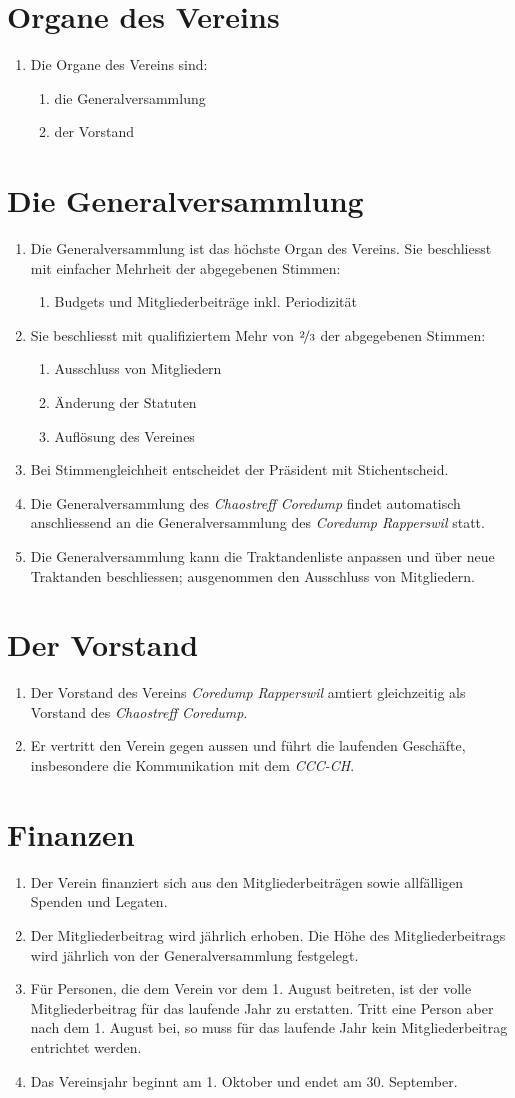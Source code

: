 \documentclass[10pt,a4paper,parskip,fleqn]{scrartcl}
\newcommand{\ol}{\begin{enumerate}[itemsep=-0.2em,topsep=-0.2em]}
\newcommand{\lo}{\end{enumerate}}
\newcommand{\li}{\item}
\newcommand{\name}{Chaostreff Coredump\xspace}
\newcommand{\iname}{\textit{\name}\xspace}
\newcommand{\parent}{Coredump Rapperswil\xspace}
\newcommand{\iparent}{\textit{\parent}\xspace}
\newcommand{\cccch}{CCC-CH\xspace}
\newcommand{\icccch}{\textit{\cccch}\xspace}
\begin{document}
\section{Organe des Vereins}

\ol
	\li Die Organe des Vereins sind:
		\ol
			\li die Generalversammlung
			\li der Vorstand
		\lo
\lo


\section{Die Generalversammlung}

\ol
	\li Die Generalversammlung ist das höchste Organ des Vereins. Sie beschliesst
	mit einfacher Mehrheit der abgegebenen Stimmen:
		\ol
			\li Budgets und Mitgliederbeiträge inkl. Periodizität
		\lo
	\li Sie beschliesst mit qualifiziertem Mehr von $\nicefrac{2}{3}$ der
	abgegebenen Stimmen:
		\ol
			\li Ausschluss von Mitgliedern
			\li Änderung der Statuten
			\li Auflösung des Vereines
		\lo
	\li Bei Stimmengleichheit entscheidet der Präsident mit Stichentscheid.
	\li Die Generalversammlung des \iname findet automatisch anschliessend an die
	Generalversammlung des \iparent statt.
	\li Die Generalversammlung kann die Traktandenliste anpassen und über neue
	Traktanden beschliessen; ausgenommen den Ausschluss von Mitgliedern.
\lo


\section{Der Vorstand}

\ol
	\li Der Vorstand des Vereins \iparent amtiert gleichzeitig als Vorstand des
	\iname.
	\li Er vertritt den Verein gegen aussen und führt die laufenden Geschäfte,
	insbesondere die Kommunikation mit dem \icccch.
\lo


\section{Finanzen}

\ol
	\li Der Verein finanziert sich aus den Mitgliederbeiträgen sowie allfälligen
	Spenden und Legaten.
	\li Der Mitgliederbeitrag wird jährlich erhoben. Die Höhe des
	Mitgliederbeitrags wird jährlich von der Generalversammlung festgelegt.
	\li Für Personen, die dem Verein vor dem 1. August beitreten, ist der volle
	Mitgliederbeitrag für das laufende Jahr zu erstatten. Tritt eine Person aber
	nach dem 1. August bei, so muss für das laufende Jahr kein Mitgliederbeitrag
	entrichtet werden.
	\li Das Vereinsjahr beginnt am 1. Oktober und endet am 30. September.
\lo
\end{document}
